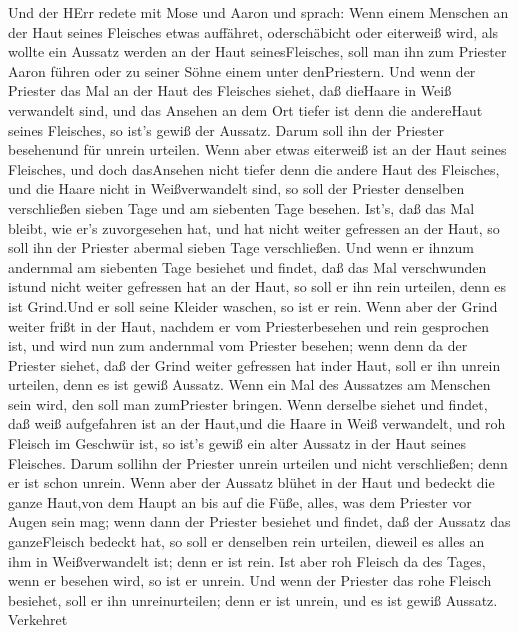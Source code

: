  Und der HErr redete mit Mose und Aaron und sprach:
 Wenn einem Menschen an der Haut seines Fleisches etwas
auffähret, oderschäbicht oder eiterweiß wird, als wollte ein Aussatz
werden an der Haut seinesFleisches, soll man ihn zum Priester Aaron
führen oder zu seiner Söhne einem unter denPriestern.  Und
wenn der Priester das Mal an der Haut des Fleisches siehet, daß dieHaare
in Weiß verwandelt sind, und das Ansehen an dem Ort tiefer ist denn die
andereHaut seines Fleisches, so ist's gewiß der Aussatz. Darum soll ihn
der Priester besehenund für unrein urteilen.  Wenn aber
etwas eiterweiß ist an der Haut seines Fleisches, und doch dasAnsehen
nicht tiefer denn die andere Haut des Fleisches, und die Haare nicht in
Weißverwandelt sind, so soll der Priester denselben verschließen sieben
Tage  und am siebenten Tage besehen. Ist's, daß das Mal
bleibt, wie er's zuvorgesehen hat, und hat nicht weiter gefressen an der
Haut,  so soll ihn der Priester abermal sieben Tage
verschließen. Und wenn er ihnzum andernmal am siebenten Tage besiehet
und findet, daß das Mal verschwunden istund nicht weiter gefressen hat
an der Haut, so soll er ihn rein urteilen, denn es ist Grind.Und er soll
seine Kleider waschen, so ist er rein.  Wenn aber der Grind
weiter frißt in der Haut, nachdem er vom Priesterbesehen und rein
gesprochen ist, und wird nun zum andernmal vom Priester besehen;
 wenn denn da der Priester siehet, daß der Grind weiter
gefressen hat inder Haut, soll er ihn unrein urteilen, denn es ist gewiß
Aussatz.  Wenn ein Mal des Aussatzes am Menschen sein wird,
den soll man zumPriester bringen.  Wenn derselbe siehet und
findet, daß weiß aufgefahren ist an der Haut,und die Haare in Weiß
verwandelt, und roh Fleisch im Geschwür ist,  so ist's
gewiß ein alter Aussatz in der Haut seines Fleisches. Darum sollihn der
Priester unrein urteilen und nicht verschließen; denn er ist schon
unrein.  Wenn aber der Aussatz blühet in der Haut und
bedeckt die ganze Haut,von dem Haupt an bis auf die Füße, alles, was dem
Priester vor Augen sein mag;  wenn dann der Priester
besiehet und findet, daß der Aussatz das ganzeFleisch bedeckt hat, so
soll er denselben rein urteilen, dieweil es alles an ihm in
Weißverwandelt ist; denn er ist rein.  Ist aber roh Fleisch
da des Tages, wenn er besehen wird, so ist er unrein.  Und
wenn der Priester das rohe Fleisch besiehet, soll er ihn unreinurteilen;
denn er ist unrein, und es ist gewiß Aussatz.  Verkehret
